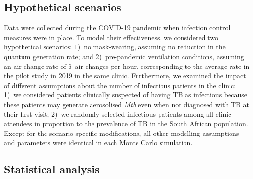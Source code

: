 \documentclass[fleqn,11pt]{wlscirep}
\begin{document}
\subsection*{}


\subsection*{Hypothetical scenarios}

Data were collected during the COVID-19 pandemic when infection control measures were in place. To model their effectiveness, we considered two hypothetical scenarios: 1)~no mask-wearing, \ie assuming no reduction in the quantum generation rate; and 2)~pre-pandemic ventilation conditions, \ie assuming an air change rate of 6~air changes per hour, corresponding to the average rate in the pilot study in 2019 in the same clinic\cite{Zurcher2022JID}. Furthermore, we examined the impact of different assumptions about the number of infectious patients in the clinic: 1)~we considered patients clinically suspected of having TB as infectious because these patients may generate aerosolised \emph{Mtb} even when not diagnosed with TB at their first visit\cite{Patterson2024PNAS}; 2)~we randomly selected infectious patients among all clinic attendees in proportion to the prevalence of TB in the South African population\cite{Moyo2022LancetID}. Except for the scenario-specific modifications, all other modelling assumptions and parameters were identical in each Monte Carlo simulation. 

\subsection*{Statistical analysis}
\end{document}
